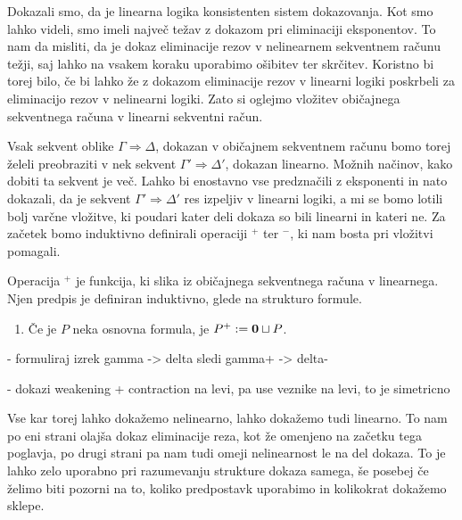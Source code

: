 Dokazali smo, da je linearna logika konsistenten sistem dokazovanja. Kot smo lahko videli, smo imeli največ težav z dokazom pri eliminaciji eksponentov. To nam da misliti, da je dokaz eliminacije rezov v nelinearnem sekventnem računu težji, saj lahko na vsakem koraku uporabimo ošibitev ter skrčitev. Koristno bi torej bilo, če bi lahko že z dokazom eliminacije rezov v linearni logiki poskrbeli za eliminacijo rezov v nelinearni logiki. Zato si oglejmo vložitev običajnega sekventnega računa v linearni sekventni račun.

Vsak sekvent oblike $\Gamma \Rightarrow \Delta$, dokazan v običajnem sekventnem računu bomo torej želeli preobraziti v nek sekvent $\Gamma' \Rightarrow \Delta'$, dokazan linearno. Možnih načinov, kako dobiti ta sekvent je več. Lahko bi enostavno vse predznačili z eksponenti in nato dokazali, da je sekvent $\Gamma' \Rightarrow \Delta'$ res izpeljiv v linearni logiki, a mi se bomo lotili bolj varčne vložitve, ki poudari kater deli dokaza so bili linearni in kateri ne. Za začetek bomo induktivno definirali operaciji $^+$ ter $^-$, ki nam bosta pri vložitvi pomagali.
\begin{definicija}
    Operacija $^+$ je funkcija, ki slika iz običajnega sekventnega računa v linearnega. Njen predpis je definiran induktivno, glede na strukturo formule.
    \begin{enumerate}
        \item Če je $P$ neka osnovna formula, je $P^+ := \mathbf{0}\sqcup P$.
    \end{enumerate}
\end{definicija}

- formuliraj izrek gamma -> delta sledi gamma+ -> delta-

- dokazi weakening + contraction na levi, pa use veznike na levi, to je simetricno

Vse kar torej lahko dokažemo nelinearno, lahko dokažemo tudi linearno. To nam po eni strani olajša dokaz eliminacije reza, kot že omenjeno na začetku tega poglavja, po drugi strani pa nam tudi omeji nelinearnost le na del dokaza. To je lahko zelo uporabno pri razumevanju strukture dokaza samega, še posebej če želimo biti pozorni na to, koliko predpostavk uporabimo in kolikokrat dokažemo sklepe.
